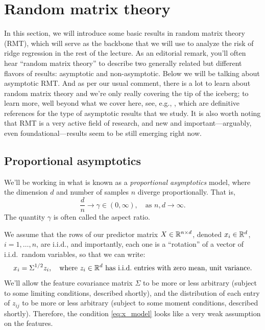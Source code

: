 \documentclass{article}
\begin{document}
\section{Random matrix theory}

In this section, we will introduce some basic results in random matrix theory
(RMT), which will serve as the backbone that we will use to analyze the risk of
ridge regression in the rest of the lecture. As an editorial remark, you'll
often hear ``random matrix theory'' to describe two generally related but
different flavors of results: asymptotic and non-asymptotic. Below we will be
talking about asymptotic RMT. And as per our usual comment, there is a lot to 
learn about random matrix theory and we're only really covering the tip of the
iceberg; to learn more, well beyond what we cover here, see, e.g.,
\citet{tulino2004random, bai2010spectral}, which are definitive references for
the type of asymptotic results that we study. It is also worth noting that RMT
is a very active field of research, and new and important---arguably, even
foundational---results seem to be still emerging right now.   

\subsection{Proportional asymptotics}

We'll be working in what is known as a \emph{proportional asymptotics} model,
where the dimension $d$ and number of samples $n$ diverge proportionally. That 
is,
\[
\frac{d}{n} \to \gamma \in (0,\infty), \quad \text{as $n,d \to \infty$}. 
\]
The quantity $\gamma$ is often called the aspect ratio.

We assume that the rows of our predictor matrix $X \in \mathbb{R}^{n \times d}$, denoted 
$x_i \in \mathbb{R}^d$, $i=1,\dots,n$, are i.i.d., and importantly, each one is a
``rotation'' of a vector of i.i.d.\ random variables, so that we can write:   
\begin{equation}
\label{eq:x_model}
x_i = \Sigma^{1/2} z_i, \quad \text{where $z_i \in \R^d$ has i.i.d.\ entries
  with zero mean, unit variance.} 
\end{equation}
We'll allow the feature covariance matrix $\Sigma$ to be more or less arbitrary 
(subject to some limiting conditions, described shortly), and the distribution
of each entry of $z_{ij}$ to be more or less arbitrary (subject to some moment
conditions, described shortly). Therefore, the condition \eqref{eq:x_model}
looks like a very weak assumption on the features.  
\end{document}
